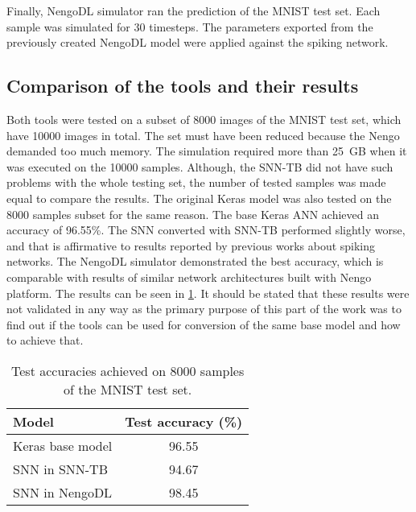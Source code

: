 Finally, NengoDL simulator ran the prediction of the MNIST test set. Each sample was simulated for 30 timesteps. The parameters exported from the previously created NengoDL model were applied against the spiking network.

\subsection{Comparison of the tools and their results}
Both tools were tested on a subset of 8000 images of the MNIST test set, which have 10000 images in total. The set must have been reduced because the Nengo demanded too much memory. The simulation required more than 25~GB when it was executed on the 10000 samples. Although, the SNN-TB did not have such problems with the whole testing set, the number of tested samples was made equal to compare the results. The original Keras model was also tested on the 8000 samples subset for the same reason. The base Keras ANN achieved an accuracy of 96.55\%. The SNN converted with SNN-TB performed slightly worse, and that is affirmative to results reported by previous works about spiking networks. The NengoDL simulator demonstrated the best accuracy, which is comparable with results of similar network architectures built with Nengo platform. The results can be seen in \cref{tab:MNIST_results}. It should be stated that these results were not validated in any way as the primary purpose of this part of the work was to find out if the tools can be used for conversion of the same base model and how to achieve that.

\begin{table}[htbp]
    \centering
    \begin{tabularx}{\linewidth}{>{\raggedright\arraybackslash}Xc}
    \toprule
        Model & Test accuracy (\%) \\
    \midrule
        Keras base model & 96.55 \\
        SNN in SNN-TB & 94.67 \\
        SNN in NengoDL & 98.45 \\
    \bottomrule
    \end{tabularx}
    \caption{Test accuracies achieved on 8000 samples of the MNIST test set.}
    \label{tab:MNIST_results}
\end{table}

